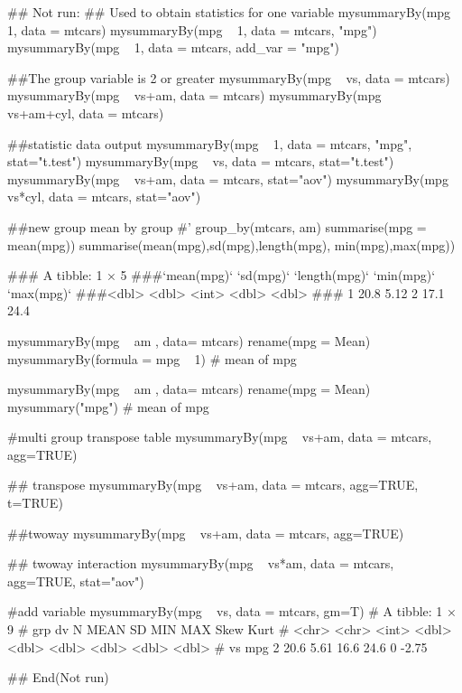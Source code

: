 \documentclass[a4paper]{book}
\begin{document}
\begin{Examples}
\begin{ExampleCode}
\#\# Not run: 
## Used to obtain statistics for one variable
mysummaryBy(mpg ~ 1, data = mtcars)
mysummaryBy(mpg ~ 1, data = mtcars, "mpg")
mysummaryBy(mpg ~ 1, data = mtcars, add_var = "mpg")

##The group variable is 2 or greater
mysummaryBy(mpg ~ vs, data = mtcars)
mysummaryBy(mpg ~ vs+am, data = mtcars)
mysummaryBy(mpg ~ vs+am+cyl, data = mtcars)

##statistic data output
mysummaryBy(mpg ~ 1, data = mtcars, "mpg", stat="t.test")
mysummaryBy(mpg ~ vs, data = mtcars, stat="t.test")
mysummaryBy(mpg ~ vs+am, data = mtcars, stat="aov")
mysummaryBy(mpg ~ vs*cyl, data = mtcars, stat="aov")

##new group mean by group
#' group_by(mtcars, am) %
 summarise(mpg = mean(mpg)) %
  summarise(mean(mpg),sd(mpg),length(mpg), min(mpg),max(mpg))

### A tibble: 1 × 5
###`mean(mpg)` `sd(mpg)` `length(mpg)` `min(mpg)` `max(mpg)`
###<dbl>     <dbl>         <int>      <dbl>      <dbl>
###  1        20.8      5.12             2       17.1       24.4

mysummaryBy(mpg ~ am , data= mtcars) %
    rename(mpg = Mean) %
      mysummaryBy(formula = mpg ~ 1)  # mean of mpg

mysummaryBy(mpg ~ am , data= mtcars) %
    rename(mpg = Mean) %
      mysummary("mpg")  # mean of mpg

#multi group transpose table
mysummaryBy(mpg ~ vs+am, data = mtcars, agg=TRUE)

## transpose
mysummaryBy(mpg ~ vs+am, data = mtcars, agg=TRUE, t=TRUE)

##twoway
mysummaryBy(mpg ~ vs+am, data = mtcars, agg=TRUE)


## twoway interaction
mysummaryBy(mpg ~ vs*am, data = mtcars, agg=TRUE, stat="aov")

#add variable
mysummaryBy(mpg ~ vs, data = mtcars, gm=T)
# A tibble: 1 × 9
# grp   dv        N  MEAN    SD   MIN   MAX  Skew  Kurt
# <chr> <chr> <int> <dbl> <dbl> <dbl> <dbl> <dbl> <dbl>
#  vs    mpg       2  20.6  5.61  16.6  24.6     0 -2.75


## End(Not run)



\end{ExampleCode}
\end{Examples}
\end{document}
